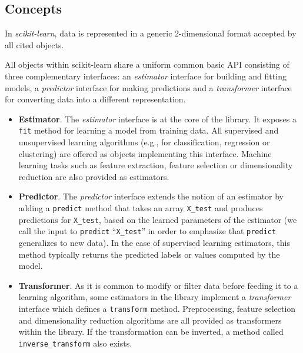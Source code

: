 \documentclass{frontiersSCNS} %
\newcounter{x}
\newcounter{y}
\newcounter{z}
\begin{document}
\subsection{Concepts}

In {\em scikit-learn}, data is represented in a generic 2-dimensional format
accepted by all cited objects.

All objects within scikit-learn share a uniform common basic API consisting of three
complementary interfaces: an \textit{estimator} interface for building and
fitting models, a \textit{predictor} interface for making predictions and a
\textit{transformer} interface for converting data into a different representation.

\begin{itemize}
\item {\bf Estimator}. The \textit{estimator} interface is at the core of the library. It exposes a
    \texttt{fit} method for learning a model from training data.  All supervised
    and unsupervised learning algorithms (e.g., for classification, regression or
    clustering) are offered as objects implementing this interface. Machine
    learning tasks such as feature extraction, feature selection or dimensionality
    reduction are also provided as estimators.

\item {\bf Predictor}. The \textit{predictor} interface extends the notion of an estimator
    by adding a \texttt{predict}
    method that takes an array \texttt{X\_test} and produces
    predictions for \texttt{X\_test}, based on the learned parameters of the
    estimator (we call the input to \texttt{predict} ``\texttt{X\_test}'' in order
    to emphasize that \texttt{predict} generalizes to new data). In the case of
    supervised learning estimators, this method typically returns the predicted
    labels or values computed by the model.

\item {\bf Transformer}. As it is common to modify or filter data before feeding it to a learning
    algorithm, some estimators in the library implement a \textit{transformer}
    interface which defines a \texttt{transform} method. Preprocessing, feature selection and
    dimensionality reduction
    algorithms are all provided as transformers within the library. If the transformation
    can be inverted, a method called \verb!inverse_transform! also exists.

\end{itemize}
\end{document}
